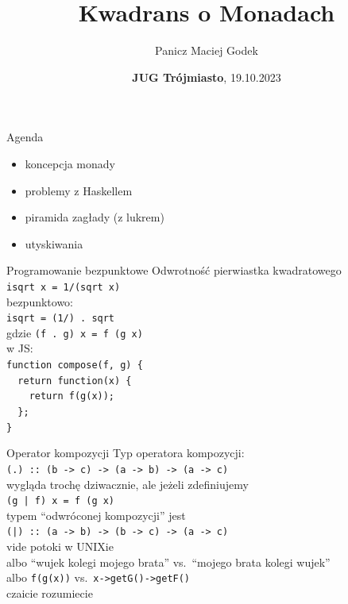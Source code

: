 \documentclass{beamer}
\title{\textbf{Kwadrans o Monadach}}
\author{Panicz Maciej Godek}
\institute{
  \tiny{\href{mailto:godek.maciek@gmail.com}{\textbf{godek.maciek@gmail.com}}} \\
  \normalsize{\url{https://github.com/panicz/writings/tree/master/talks/jug/kwadrans}}
}
\date{\textbf{JUG Trójmiasto}, 19.10.2023}
\begin{document}
\begin{frame}
  \titlepage
\end{frame}

\begin{frame}{Agenda}
  \begin{itemize}
    \pause \item koncepcja monady
    \pause \item problemy z Haskellem
    \pause \item piramida zagłady (z lukrem)
    \pause \item utyskiwania
  \end{itemize}
\end{frame}

\begin{frame}{Programowanie bezpunktowe}
  Odwrotność pierwiastka kwadratowego \\ \pause
  \texttt{isqrt x = 1/(sqrt x)} \\ \pause
  bezpunktowo: \\ \pause
  \texttt{isqrt = (1/) .\ sqrt} \\ \pause
  gdzie
  \texttt{(f .\ g) x = f (g x)} \\ \pause
  w JS: \\
  \texttt{function compose(f, g) \{ \\
    \ \ return function(x) \{ \\
    \ \ \ \ return f(g(x)); \\
    \ \ \}; \\
    \}}  
\end{frame}

\begin{frame}{Operator kompozycji}
  Typ operatora kompozycji: \\ \pause
  \texttt{(.) :: (b -> c) -> (a -> b) -> (a -> c)} \\ \pause
  wygląda trochę dziwacznie, ale jeżeli zdefiniujemy \\
  \texttt{(g | f) x = f (g x)} \\ \pause
  typem ``odwróconej kompozycji'' jest \\ \pause
  \texttt{(|) :: (a -> b) -> (b -> c) -> (a -> c)} \\ \pause
  vide potoki w UNIXie \\ \pause
  albo ``wujek kolegi mojego brata'' vs.\ ``mojego brata kolegi wujek'' \\ \pause
  albo \texttt{f(g(x))} vs.\ \texttt{x->getG()->getF()} \\ \pause
  czaicie rozumiecie
\end{frame}
\end{document}
